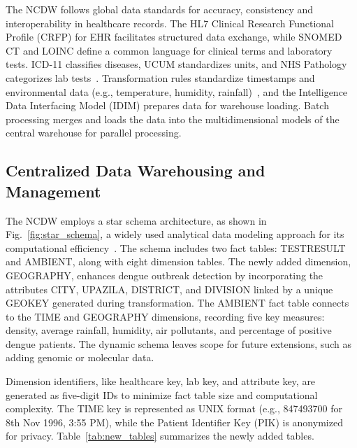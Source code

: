 The NCDW follows global data standards for accuracy, consistency  and  interoperability in healthcare records. The HL7 Clinical Research Functional Profile (CRFP) for EHR facilitates structured data exchange, while SNOMED CT and LOINC define a common language for clinical terms and laboratory tests. ICD-11 classifies diseases, UCUM standardizes units, and NHS Pathology categorizes lab tests~\cite{NCVHS2018,ICD-11}. Transformation rules standardize timestamps and environmental data (e.g., temperature, humidity, rainfall)~\cite{batini2009methodologies}, and the Intelligence Data Interfacing Model (IDIM) prepares data for warehouse loading. Batch processing merges and loads the data into the multidimensional models of the central warehouse for parallel processing.






\subsection{Centralized Data Warehousing and Management}
\vspace{-1.5mm}
The NCDW employs a star schema architecture, as shown in Fig.~\ref{fig:star_schema}, a widely used analytical data modeling approach for its computational efficiency~\cite{Nugawela, Insights_clinical, 4743972}. The schema includes two fact tables: TESTRESULT and AMBIENT, along with eight dimension tables. The newly added dimension, GEOGRAPHY, enhances dengue outbreak detection by incorporating the attributes CITY, UPAZILA, DISTRICT, and DIVISION linked by a unique GEOKEY generated during transformation. The AMBIENT fact table connects to the TIME and GEOGRAPHY dimensions, recording five key measures: density, average rainfall, humidity, air pollutants, and percentage of positive dengue patients. The dynamic schema leaves scope for future extensions, such as adding genomic or molecular data.

Dimension identifiers, like healthcare key, lab key, and attribute key, are generated as five-digit IDs to minimize fact table size and computational complexity. The TIME key is represented as UNIX format (e.g., 847493700 for 8th Nov 1996, 3:55 PM), while the Patient Identifier Key (PIK) is anonymized for privacy. Table~\ref{tab:new_tables} summarizes the newly added tables.

\begin{table}[ht]
    \centering
    \caption{Details of newly added fact and dimension tables}
    \label{tab:new_tables}
\end{table}

